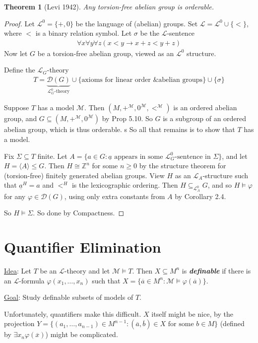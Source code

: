 \documentclass[]{article}
\theoremstyle{custhm}
\newtheorem{theorem}{Theorem}[section]
\theoremstyle{cusdef}
\theoremstyle{custhm}
\theoremstyle{custhm}
\theoremstyle{custhm}
\theoremstyle{ex}
\theoremstyle{custhm}
\theoremstyle{cusdef}
\theoremstyle{remark}
\theoremstyle{remark}
\theoremstyle{numremark}
\newcommand{\Z}{\mathbb{Z}}
\newcommand{\ra}{\rightarrow}
\newcommand{\undf}[1]{\textit{\textbf{#1}}}
\renewcommand{\L}{\mathcal{L}}
\newcommand{\M}{\mathcal{M}}
\renewcommand{\phi}{\varphi}
\renewcommand{\bar}{\overline}
\newcommand{\D}{\mathcal{D}}
\renewcommand{\subset}{\subseteq}
\begin{document}
\begin{theorem}[Levi 1942]
Any torsion-free abelian group is orderable.
\end{theorem}
\begin{proof}
Let $\L^0 = \{+,0\}$ be the language of (abelian) groups. Set $\L = \L^0 \cup\{<\}$, where $<$ is a binary relation symbol. Let $\sigma$ be the $\L$-sentence
\begin{align*}
\forall x \forall y\forall z ( x< y \ra x + z < y + z)
\end{align*}
Now let $G$ be a torsion-free abelian group, viewed as an $\L^0$ structure.

Define the $\L_G$-theory
\begin{align*}
T = \underbrace{\D(G)}_{\L_G^0\textrm{-theory}}\cup\{\textrm{axioms for linear order \& abelian groups}\}\cup\{\sigma\}
\end{align*}

Suppose $T$ has a model $\M$. Then $(M,+^\M,0^\M,<^\M)$ is an ordered abelian group, and $G\subset (M,+^\M,0^\M)$ by Prop 5.10. So $G$ is a subgroup of an ordered abelian group, which is thus orderable.
s
So all that remains is to show that $T$ has a model.

Fix $\Sigma \subset T$ finite. Let $A = \{a\in G: \underline{a}\textrm{ appears in some }\L_G^0\textrm{-sentence in }\Sigma\}$, and let $H = \langle A\rangle \le G$. Then $H\cong \Z^n$ for some $n\ge 0$ by the structure theorem for (torsion-free) finitely generated abelian groups. View $H$ as an $\L_A$-structure such that $\underline{a}^H = a$ and $<^H$ is the lexicographic ordering. Then $H\subset_{\L_A^0} G$, and so $H\models \phi$ for any $\phi \in \D(G)$, using only extra constants from $A$ by Corollary 2.4.

So $H\models \Sigma$. So done by Compactness.
\end{proof}


\section*{Quantifier Elimination}

\underline{Idea}: Let $T$ be an $\L$-theory and let $\M\models T$. Then $X\subset M^n$ is \undf{definable} if there is an $\L$-formula $\phi(x_1,\dots,x_n)$ such that $X = \{\bar{a}\in M^n : \M\models \phi(\bar{a})\}$.

\underline{Goal}: Study definable subsets of models of $T$.

Unfortunately, quantifiers make this difficult. $X$ itself might be nice, by the projection $Y = \{(a_1,\dots,a_{n-1})\in M^{n-1}:(\bar{a},\bar{b})\in X\textrm{ for some }b\in M\}$ (defined by $\exists x_n \phi(\bar{x})$) might be complicated.
\end{document}
